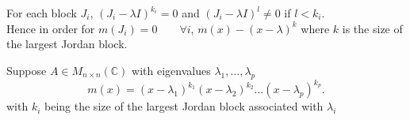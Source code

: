 \documentclass{report}
\begin{document}
{%



   For each block $ J_i$, $ \left( J_i - \lambda I \right) ^{k_i} =0$ and $ \left( J_i - \lambda I \right) ^{l} \neq 0 $ if $ l < k_i$.\\
   Hence in order for $ m \left( J_i \right) =0 \qquad  \forall  i$, $ m \left( x \right) - \left( x - \lambda \right) ^{k}$ where $ k$ is the size of the largest Jordan block.
  }
            \begin{corollary}[ ]
                       Suppose $ A \in M _{ n \times  n}\left( \mathbb{C} \right) $ with eigenvalues $ \lambda_1 , \ldots , \lambda_p$
  \[
  m \left( x \right) = \left( x - \lambda_1 \right) ^{k_1} \left( x - \lambda_2 \right) ^{ k_2} \ldots  \left( x - \lambda_p \right) ^{k_p}
  .\] 
  with $ k_i$ being the size of the largest Jordan block associated with $ \lambda_i$                        
            \end{corollary}
\end{document}
